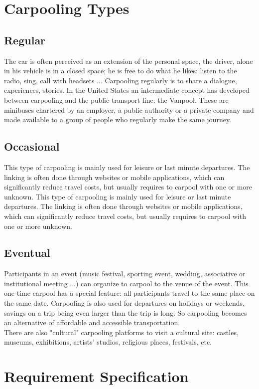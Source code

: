 \section{Carpooling Types}
\subsection{Regular}
The car is often perceived as an extension of the personal space, the driver, alone in 
his vehicle is in a closed space; he is free to do what he likes: listen to the radio, sing, call 
with headsets ... Carpooling regularly is to share a dialogue, experiences, stories.
In the United States an intermediate concept has developed between carpooling and 
the public transport line: the Vanpool. These are minibuses chartered by an employer, a 
public authority or a private company and made available to a group of people who 
regularly make the same journey.

\subsection{Occasional}
This type of carpooling is mainly used for leisure or last minute departures. The 
linking is often done through websites or mobile applications, which can significantly 
reduce travel costs, but usually requires to carpool with one or more unknown.
This type of carpooling is mainly used for leisure or last minute departures. The 
linking is often done through websites or mobile applications, which can significantly 
reduce travel costs, but usually requires to carpool with one or more unknown.

\subsection{Eventual}
Participants in an event (music festival, sporting event, wedding, associative or 
institutional meeting ...) can organize to carpool to the venue of the event. This one-time 
carpool has a special feature: all participants travel to the same place on the same date.
Carpooling is also used for departures on holidays or weekends, savings on a trip 
being even larger than the trip is long. So carpooling becomes an alternative of affordable 
and accessible transportation.
\\ There are also "cultural" carpooling platforms to visit a cultural site: castles, 
museums, exhibitions, artists' studios, religious places, festivals, etc.
\section{Requirement Specification}
